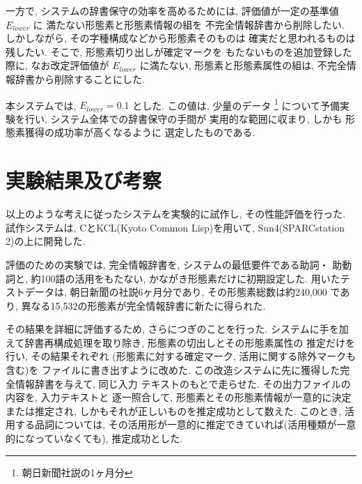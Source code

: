 一方で, 
システムの辞書保守の効率を高めるためには, 
評価値が一定の基準値 $E_{lower}$ に
満たない形態素と形態素情報の組を
不完全情報辞書から削除したい. 
しかしながら, 
その字種構成などから形態素そのものは
確実だと思われるものは残したい. 
そこで, 形態素切り出しが確定マークを
もたないものを追加登録した際に, 
なお改定評価値が $E_{lower}$ に満たない, 
形態素と形態素属性の組は, 
不完全情報辞書から削除することにした. 

本システムでは, $E_{lower} = 0.1$ とした. 
この値は, 
少量のデータ
\footnote{朝日新聞社説の1ヶ月分}
について予備実験を行い, 
システム全体での辞書保守の手間が
実用的な範囲に収まり, しかも
形態素獲得の成功率が高くなるように
選定したものである. 

\vspace{-0,5mm}
\section{実験結果及び考察}
\label{experiment}
\vspace{-0,5mm}


以上のような考えに従ったシステムを実験的に試作し, 
その性能評価を行った. 試作システムは, 
CとKCL(Kyoto Common Lisp)を用いて,
 Sun4(SPARCstation 2)の上に開発した. 

評価のための実験では, 完全情報辞書を, システムの最低要件である助詞・
助動詞と, 約100語の活用をもたない, かながき形態素だけに初期設定した. 
用いたテストデータは, 朝日新聞の社説6ヶ月分であり, その形態素総数は約240,000
であり, 異なる15,532の形態素が完全情報辞書に新たに得られた. 

その結果を詳細に評価するため, さらにつぎのことを行った. 
システムに手を加えて辞書再構成処理を取り除き, 
形態素の切出しとその形態素属性の
推定だけを行い, その結果それぞれ
(形態素に対する確定マーク, 活用に関する除外マークも含む)を
ファイルに書き出すように改めた.  
この改造システムに先に獲得した完全情報辞書を与えて, 同じ入力
テキストのもとで走らせた. その出力ファイルの内容を, 入力テキストと
逐一照合して, 形態素とその形態素情報が一意的に決定または推定され, 
しかもそれが正しいものを推定成功として数えた. 
このとき, 活用する品詞については, 
その活用形が一意的に推定できていれば(活用種類が一意的になっていなくても), 
推定成功とした.  

